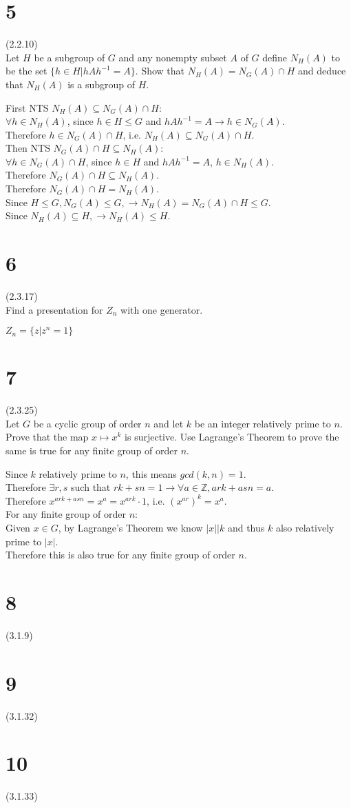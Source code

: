\documentclass{article}
\begin{document}
\section*{5}
(2.2.10)\\
Let $H$ be a subgroup of $G$ and any nonempty subset $A$ of $G$ define $N_H(A)$ to be the set $\{h \in H | hAh^{-1} = A\}$. Show that $N_H(A) = N_G(A) \cap H$ and deduce that $N_H(A)$ is a subgroup of $H$.
\begin{addmargin}[1em]{0em}
    First NTS $N_H(A) \subseteq N_G(A) \cap H$:\\
    $\forall h \in N_H(A)$, since $h \in H \leq G$ and $hAh^{-1} = A \rightarrow h \in N_G(A)$.\\
    Therefore $h \in N_G(A) \cap H$, i.e. $N_H(A) \subseteq N_G(A) \cap H$.\\
    Then NTS $N_G(A) \cap H \subseteq N_H(A)$:\\
    $\forall h \in N_G(A) \cap H$, since $h \in H$ and $hAh^{-1} = A$, $h \in N_H(A)$.\\
    Therefore $N_G(A) \cap H \subseteq N_H(A)$.\\
    Therefore $N_G(A) \cap H = N_H(A)$.\\
    Since $H \leq G, N_G(A) \leq G, \rightarrow N_H(A)=N_G(A) \cap H \leq G$.\\
    Since $N_H(A) \subseteq H, \rightarrow N_H(A) \leq H$.
\end{addmargin}
\section*{6}
(2.3.17)\\
Find a presentation for $Z_n$ with one generator.
\begin{addmargin}[1em]{0em}
    $Z_n = \{z|z^n=1\}$
\end{addmargin}
\section*{7}
(2.3.25)\\
Let $G$ be a cyclic group of order $n$ and let $k$ be an integer relatively prime to $n$. Prove that the map $x \mapsto x^k$ is surjective. Use Lagrange's Theorem to prove the same is true for any finite group of order $n$.
\begin{addmargin}[1em]{0em}
    Since $k$ relatively prime to $n$, this means $gcd(k, n) = 1$.\\
    Therefore $\exists r, s$ such that $rk+sn = 1 \rightarrow \forall a \in \mathbb{Z}, ark+asn = a$.\\
    Therefore $x^{ark+asn} = x^a = x^{ark} \cdot 1$, i.e. $(x^{ar})^k = x^a$.\\
    For any finite group of order $n$:\\
    Given $x \in G$, by Lagrange's Theorem we know $|x||k$ and thus $k$ also relatively prime to $|x|$.\\
    Therefore this is also true for any finite group of order $n$.
\end{addmargin}
\section*{8}
(3.1.9)
\section*{9}
(3.1.32)
\section*{10}
(3.1.33)
\end{document}
